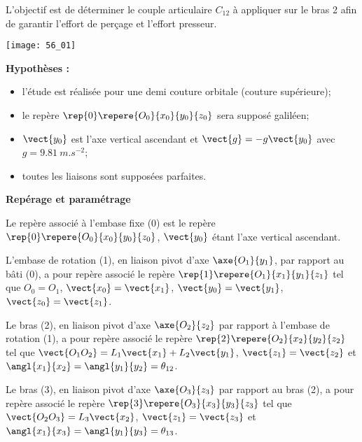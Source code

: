 \normalfalse \difficiletrue \tdifficilefalse
\correctiontrue


\setcounter{question}{0}
\ifcorrection
\else
{}
\fi

\ifprof
\else

\begin{obj}
L'objectif est de déterminer le couple articulaire $C_{12}$ à appliquer sur le bras 2 afin de garantir l'effort de
perçage et l’effort presseur.
\end{obj}


\begin{center}
\texttt{[image: 56\_01]}
\end{center}


\textbf{Hypothèses :}
\begin{itemize}
\item l'étude est réalisée pour une demi couture orbitale (couture supérieure);
\item le repère $\rep{0}\repere{O_0}{x_0}{y_0}{z_0}$ sera supposé galiléen;
\item $\vect{y_0}$ est l’axe vertical ascendant et $\vect{g}=-g\vect{y_0}$ avec $g = \SI{9,81}{m.s^{-2}}$;
\item toutes les liaisons sont supposées parfaites.
\end{itemize}



\textbf{Repérage et paramétrage}

Le repère associé à l'embase fixe (0) est le repère $\rep{0}\repere{O_0}{x_0}{y_0}{z_0}$, $\vect{y_0}$ étant l'axe vertical
ascendant.

L'embase de rotation (1), en liaison pivot d'axe $\axe{O_1}{y_1}$, par rapport au bâti (0), a pour repère
associé le repère $\rep{1}\repere{O_1}{x_1}{y_1}{z_1}$ tel que $O_0=O_1$, $\vect{x_0}=\vect{x_1}$, $\vect{y_0}=\vect{y_1}$, $\vect{z_0}=\vect{z_1}$.

Le bras (2), en liaison pivot d'axe $\axe{O_2}{z_2}$ par rapport à l’embase de rotation (1), a pour repère
associé le repère $\rep{2}\repere{O_2}{x_2}{y_2}{z_2}$ tel que $\vect{O_1 O_2} = L_1\vect{x_1} + L_2\vect{y_1}$, $\vect{z_1}=\vect{z_2}$ et $\angl{x_1}{x_2}=\angl{y_1}{y_2}=\theta_{12}$.

Le bras (3), en liaison pivot d'axe $\axe{O_3}{z_3}$ par rapport au bras (2), a pour repère
associé le repère $\rep{3}\repere{O_3}{x_3}{y_3}{z_3}$ tel que $\vect{O_2 O_3} = L_3\vect{x_2} $, $\vect{z_1}=\vect{z_3}$ et $\angl{x_1}{x_3}=\angl{y_1}{y_3}=\theta_{13}$.


